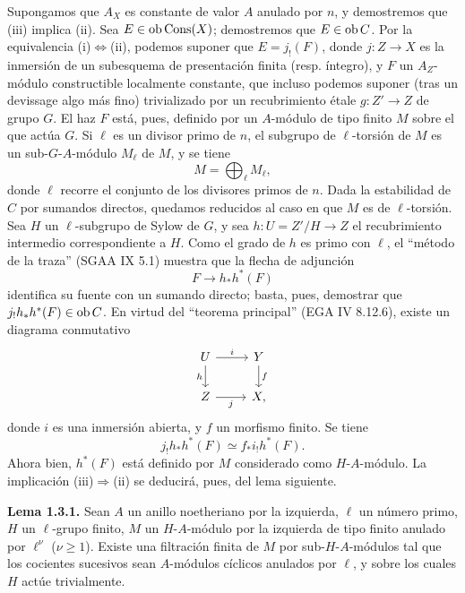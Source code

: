 Supongamos que $A_X$ es constante de valor $A$ anulado por $n$, y demostremos que (iii) implica (ii). Sea $E\in\operatorname{ob}\operatorname{Cons}(X)$; demostremos que $E\in\operatorname{ob} C$. Por la equivalencia (i)$\Leftrightarrow$(ii), podemos suponer que $E=j_!(F)$, donde $j:Z\to X$ es la inmersión de un subesquema de presentación finita (resp. íntegro), y $F$ un $A_Z$-módulo constructible localmente constante, que incluso podemos suponer (tras un devissage algo más fino) trivializado por un recubrimiento étale $g:Z'\to Z$ de grupo $G$. El haz $F$ está, pues, definido por un $A$-módulo de tipo finito $M$ sobre el que actúa $G$. Si $\ell$ es un divisor primo de $n$, el subgrupo de $\ell$-torsión de $M$ es un sub-$G$-$A$-módulo $M_\ell$ de $M$, y se tiene
\[
        M=\bigoplus_\ell M_\ell,
\]
donde $\ell$ recorre el conjunto de los divisores primos de $n$. Dada la estabilidad de $C$ por sumandos directos, quedamos reducidos al caso en que $M$ es de $\ell$-torsión. Sea $H$ un $\ell$-subgrupo de Sylow de $G$, y sea $h:U=Z'/H\to Z$ el recubrimiento intermedio correspondiente a $H$. Como el grado de $h$ es primo con $\ell$, el ``método de la traza'' (SGAA IX 5.1) muestra que la flecha de adjunción
\[
        F\longrightarrow h_*h^*(F)
\]
identifica su fuente con un sumando directo; basta, pues, demostrar que $j_!h_*h^*(F)\in\operatorname{ob} C$. En virtud del ``teorema principal'' (EGA IV 8.12.6), existe un diagrama conmutativo
\[
\begin{tikzcd}
U \arrow[r,"i"] \arrow[d,"h"'] & Y \arrow[d,"f"]\\
Z \arrow[r,"j"'] & X,
\end{tikzcd}
\]
donde $i$ es una inmersión abierta, y $f$ un morfismo finito. Se tiene
\[
        j_!h_*h^*(F) \simeq f_* i_! h^*(F).
\]
Ahora bien, $h^*(F)$ está definido por $M$ considerado como $H$-$A$-módulo. La implicación (iii)$\Rightarrow$(ii) se deducirá, pues, del lema siguiente.

\textbf{Lema 1.3.1.} Sean $A$ un anillo noetheriano por la izquierda, $\ell$ un número primo, $H$ un $\ell$-grupo finito, $M$ un $H$-$A$-módulo por la izquierda de tipo finito anulado por $\ell^\nu$ ($\nu\geq 1$). Existe una filtración finita de $M$ por sub-$H$-$A$-módulos tal que los cocientes sucesivos sean $A$-módulos cíclicos anulados por $\ell$, y sobre los cuales $H$ actúe trivialmente.

